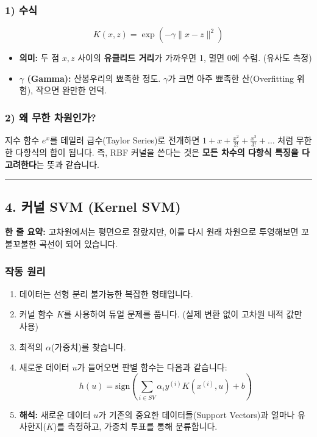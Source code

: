 \documentclass[11pt,a4paper]{book}
\theoremstyle{definition}
\begin{document}
\subsubsection*{1) 수식}
$$ K(x, z) = \exp\left( -\gamma \| x - z \|^2 \right) $$
\begin{itemize}
    \item \textbf{의미:} 두 점 $x, z$ 사이의 \textbf{유클리드 거리}가 가까우면 1, 멀면 0에 수렴. (유사도 측정)
    \item \textbf{$\gamma$ (Gamma):} 산봉우리의 뾰족한 정도. $\gamma$가 크면 아주 뾰족한 산(Overfitting 위험), 작으면 완만한 언덕.
\end{itemize}


\subsubsection*{2) 왜 무한 차원인가?}
지수 함수 $e^x$를 테일러 급수(Taylor Series)로 전개하면 $1 + x + \frac{x^2}{2!} + \frac{x^3}{3!} + \dots$ 처럼 무한한 다항식의 합이 됩니다.
즉, RBF 커널을 쓴다는 것은 \textbf{모든 차수의 다항식 특징을 다 고려한다}는 뜻과 같습니다.

\vspace{0.5cm}\hrule\vspace{0.5cm}

\subsection{4. 커널 SVM (Kernel SVM)}

\begin{conceptbox}[title={개념 4: 휘어지는 경계선}]
\textbf{한 줄 요약:} 고차원에서는 평면으로 잘랐지만, 이를 다시 원래 차원으로 투영해보면 꼬불꼬불한 곡선이 되어 있습니다.
\end{conceptbox}

\subsubsection*{작동 원리}
\begin{enumerate}
    \item 데이터는 선형 분리 불가능한 복잡한 형태입니다.
    \item 커널 함수 $K$를 사용하여 듀얼 문제를 풉니다. (실제 변환 없이 고차원 내적 값만 사용)
    \item 최적의 $\alpha$(가중치)를 찾습니다.
    \item 새로운 데이터 $u$가 들어오면 판별 함수는 다음과 같습니다:
    $$ h(u) = \text{sign}\left( \sum_{i \in SV} \alpha_i y^{(i)} K(x^{(i)}, u) + b \right) $$
    \item \textbf{해석:} 새로운 데이터 $u$가 기존의 중요한 데이터들(Support Vectors)과 얼마나 유사한지($K$)를 측정하고, 가중치 투표를 통해 분류합니다.
\end{enumerate}
\end{document}
